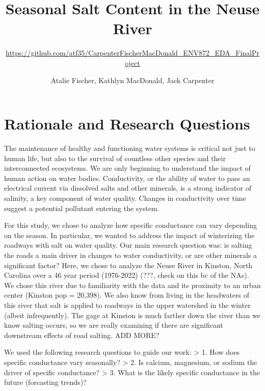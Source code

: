 \documentclass[
  12pt,
]{article}
\title{Seasonal Salt Content in the Neuse River}
\subtitle{\url{https://github.com/atf35/CarpenterFischerMacDonald_ENV872_EDA_FinalProject}}
\author{Atalie Fischer, Kathlyn MacDonald, Jack Carpenter}
\date{}
\begin{document}
\maketitle

{
\setcounter{tocdepth}{2}
\tableofcontents
}
\newpage
\tableofcontents

\newpage
\listoftables 
\newpage
\listoffigures 
\newpage

\hypertarget{rationale-and-research-questions}{%
\section{Rationale and Research
Questions}\label{rationale-and-research-questions}}

The maintenance of healthy and functioning water systems is critical not
just to human life, but also to the survival of countless other species
and their interconnected ecosystems. We are only beginning to understand
the impact of human action on water bodies. Conductivity, or the ability
of water to pass an electrical current via dissolved salts and other
minerals, is a strong indicator of salinity, a key component of water
quality. Changes in conductivity over time suggest a potential pollutant
entering the system.

For this study, we chose to analyze how specific conductance can vary
depending on the season. In particular, we wanted to address the impact
of winterizing the roadways with salt on water quality. Our main
research question was: is salting the roads a main driver in changes to
water conductivity, or are other minerals a significant factor? Here, we
chose to analyze the Neuse River in Kinston, North Carolina over a 46
year period (1976-2022) (???, check on this bc of the NAs). We chose
this river due to familiarity with the data and its proximity to an
urban center (Kinston pop = 20,398). We also know from living in the
headwaters of this river that salt is applied to roadways in the upper
watershed in the winter (albeit infrequently). The gage at Kinston is
much farther down the river than we know salting occurs, so we are
really examining if there are significant downstream effects of road
salting. ADD MORE?

We used the following research questions to guide our work:
\textgreater{} 1. How does specific conductance vary seasonally?
\textgreater{} 2. Is calcium, magnesium, or sodium the driver of
specific conductance? \textgreater{} 3. What is the likely specific
conductance in the future (forcasting trends)?
\end{document}
